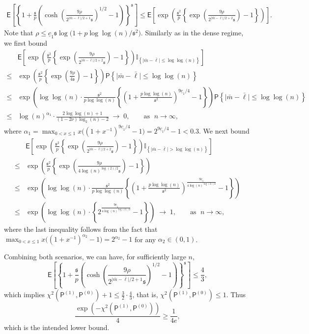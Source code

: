 \documentclass[11pt, a4paper]{article}
\renewcommand{\l}{\left}
\renewcommand{\r}{\right}
\newcommand{\E}[0]{\mathsf{E}}
\newcommand{\p}{\mathsf{P}}
\theoremstyle{definition}
\theoremstyle{definition}
\theoremstyle{definition}
\theoremstyle{definition}
\theoremstyle{definition}
\theoremstyle{remark}
\theoremstyle{definition}
\theoremstyle{definition}
\theoremstyle{definition}
\begin{document}
\begin{description}
\begin{align*}
\E\l[\l\{ 1 + \frac{\mathfrak{s}}{p}\l( \cosh\l( \frac{9\rho  }{2^{\vert \bar{m}-\bar{\ell}\vert/2+1}\mathfrak{s}}\r)^{1/2} - 1 \r)\r\}^{\mathfrak{s}}\r]
\le \E\l[ \exp\l( \frac{\mathfrak{s}^2}{p}\l\{\exp\l( \frac{9\rho  }{2^{\vert \bar{m}-\bar{\ell}\vert/2+2}\mathfrak{s}}\r)-1\r\}\r)\r].
\end{align*}
Note that $\rho \le \underline{c}_1 \mathfrak{s}\log\bigl(1 +  p\log\log(n)/\mathfrak{s}^2\bigr)$. Similarly as in the dense regime, we first bound  
\begin{align*}
& \E\l[ \exp\l( \frac{\mathfrak{s}^2}{p}\l\{\exp\l( \frac{9\rho  }{2^{\vert \bar{m}-\bar{\ell}\vert/2+2}\mathfrak{s}}\r)-1\r\}\r)\mathbb{I}_{\l\{\vert\bar{m}-\bar{\ell}\vert \le \log\log(n)\r\}} \r]\\
\le & \exp\l( \frac{\mathfrak{s}^2}{p}\l\{\exp\l( \frac{9\rho  }{4\mathfrak{s}}\r)-1\r\}\r)\p\l\{\vert\bar{m}-\bar{\ell}\vert \le \log\log(n)\r\} \\
\le & \exp\l(\log\log(n)\cdot\frac{\mathfrak{s}^2}{p\log\log(n)}\l\{\l(1 + \frac{p\log\log(n)}{\mathfrak{s}^2}\r)^{{9\underline{c}_1}/{4}} - 1\r\}\r) \p\l\{\vert\bar{m}-\bar{\ell}\vert \le \log\log(n)\r\}\\
\le & \log(n)^{\alpha_1}\cdot\frac{2\log\log (n) +1}{(1-2\nu)\log_2(n) - 2 }\; \to\; 0, \qquad\text{as }\; n \to\infty,
\end{align*}
where $\alpha_1 = \max_{0 < x \le 1} x \bigl((1+x^{-1})^{9\underline{c}_1/4} -1\bigr) = 2^{9\underline{c}_1/4} - 1 < 0.3$. We next bound
\begin{align*}
& \E\l[ \exp\l( \frac{\mathfrak{s}^2}{p}\l\{\exp\l( \frac{9\rho  }{2^{\vert \bar{m}-\bar{\ell}\vert/2+2}\mathfrak{s}}\r)-1\r\}\r)\mathbb{I}_{\l\{\vert\bar{m}-\bar{\ell}\vert > \log\log(n)\r\}} \r]\\
\le & \exp\l(\frac{\mathfrak{s}^2}{p}\l\{\exp\l( \frac{9\rho  }{4\log(n)^{\log(2)/2}\mathfrak{s}}\r)-1\r\}\r) \\
\le & \exp\l(\log\log(n)\cdot\frac{\mathfrak{s}^2}{p\log\log(n)}\l\{\l(1 +\frac{p\log\log(n)}{\mathfrak{s}^2}\r)^{\frac{9\underline{c}_1 }{4\log(n)^{\log(2)/2}}}-1\r\}\r) \\
\le & \exp\l(\log\log(n)\cdot\l\{ 2^{\frac{9\underline{c}_1 }{4\log(n)^{\log(2)/2}}}-1\r\}\r)\;\to\; 1, \qquad\text{as }\; n\to \infty,
\end{align*}
where the last inequality follows from the fact that $\max_{0< x \le 1} x\bigl((1+x^{-1})^{\alpha_2} - 1\bigr) = 2^{\alpha_2} - 1$ for any $\alpha_2\in(0,1)$. 
\end{description}
Combining both scenarios, we can have, for sufficiently large $n$,
\[
\E\l[\l\{ 1 + \frac{\mathfrak{s}}{p}\l( \cosh\l( \frac{9\rho  }{2^{\vert \bar{m}-\bar{\ell}\vert/2+1}\mathfrak{s}}\r)^{1/2} - 1 \r)\r\}^{\mathfrak{s}}\r] \le \frac{4}{3},
\]
which implies $\chi^2(\p^{(1)},\p^{(0)}) + 1 \le \frac{3}{2} \cdot \frac{4}{3}$, that is,  $\chi^2(\p^{(1)},\p^{(0)}) \le 1$. Thus
\[
\frac{\exp\l(-\chi^2(\p^{(1)},\p^{(0)})\r)}{4} \ge \frac{1}{4e},
\]
which is the intended lower bound.  
\end{document}
